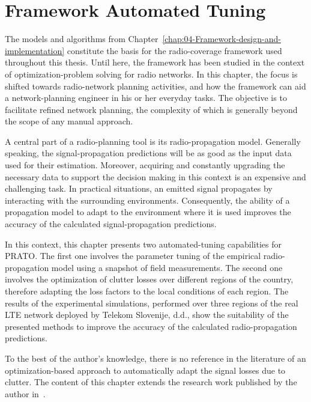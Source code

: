
\chapter{Framework Automated Tuning \label{chap:05-Framework_parameter_tuning}}


\noindent The models and algorithms from Chapter~\ref{chap:04-Framework-design-and-implementation}
constitute the basis for the radio-coverage framework used throughout
this thesis. Until here, the framework has been studied in the context
of optimization-problem solving for radio networks. In this chapter,
the focus is shifted towards radio-network planning activities, and
how the framework can aid a network-planning engineer in his or her
everyday tasks. The objective is to facilitate refined network planning,
the complexity of which is generally beyond the scope of any manual
approach.

A central part of a radio-planning tool is its radio-propagation model.
Generally speaking, the signal-propagation predictions will be as
good as the input data used for their estimation. Moreover, acquiring
and constantly upgrading the necessary data to support the decision
making in this context is an expensive and challenging task. In practical
situations, an emitted signal propagates by interacting with the surrounding
environments. Consequently, the ability of a propagation model to
adapt to the environment where it is used improves the accuracy of
the calculated signal-propagation predictions.

In this context, this chapter presents two automated-tuning capabilities
for PRATO. The first one involves the parameter tuning of the empirical
radio-propagation model using a snapshot of field measurements. The
second one involves the optimization of clutter losses over different
regions of the country, therefore adapting the loss factors to the
local conditions of each region. The results of the experimental simulations,
performed over three regions of the real LTE network deployed by Telekom
Slovenije, d.d., show the suitability of the presented methods to
improve the accuracy of the calculated radio-propagation predictions.

To the best of the author's knowledge, there is no reference in the
literature of an optimization-based approach to automatically adapt
the signal losses due to clutter. The content of this chapter extends
the research work published by the author in~\cite{Benedicic-An_adaptable_parallel_simulation_framework_for_LTE_coverage_planning:2013}. 


